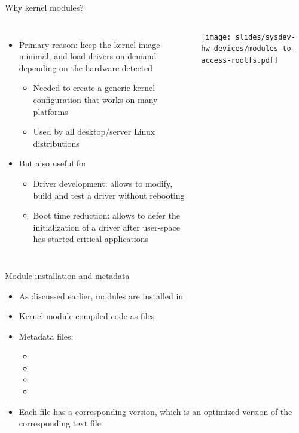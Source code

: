 \begin{frame}{Why kernel modules?}
  \begin{columns}
    \begin{itemize}
    \item Primary reason: keep the kernel image minimal, and load
      drivers on-demand depending on the hardware detected
      \begin{itemize}
      \item Needed to create a generic kernel configuration that works
        on many platforms
      \item Used by all desktop/server Linux distributions
      \end{itemize}
    \item But also useful for
      \begin{itemize}
      \item Driver development: allows to modify, build and test a
        driver without rebooting
      \item Boot time reduction: allows to defer the initialization of
        a driver after user-space has started critical applications
      \end{itemize}
    \end{itemize}
    \texttt{[image: slides/sysdev-hw-devices/modules-to-access-rootfs.pdf]}
  \end{columns}
\end{frame}

\begin{frame}{Module installation and metadata}
  \begin{itemize}
  \item As discussed earlier, modules are installed in
  \item Kernel module compiled code as  files
  \item Metadata files:
    \begin{itemize}
    \item {}
    \item {}
    \item {}
    \item {}
    \end{itemize}
  \item Each file has a corresponding  version, which is an optimized version of the corresponding text file
  \end{itemize}
\end{frame}

